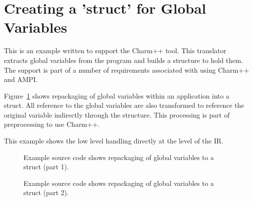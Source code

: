 \section{Creating a 'struct' for Global Variables}
   This is an example written to support the Charm++ tool. This translator
extracts global variables from the program and builds a structure to hold them.
The support is part of a number of requirements associated with using Charm++
and AMPI.

   Figure~\ref{Tutorial:exampleGlobalVariableHandling} shows repackaging of global
variables within an application into a struct. All reference to the global variables
are also transformed to reference the original variable indirectly through the structure.
This processing is part of preprocessing to use Charm++.  

   This example shows the low level handling directly at the level of the IR.

\begin{figure}[!h]
{\indent
{\mySmallestFontSize


\begin{latexonly}
%  
   
\end{latexonly}

\begin{htmlonly}
   
\end{htmlonly}

}
}
\caption{Example source code shows repackaging of global variables to a struct (part 1).}
\label{Tutorial:exampleGlobalVariableHandling}
\end{figure}

\begin{figure}[!h]
{\indent
{\mySmallestFontSize


\begin{latexonly}
   
\end{latexonly}

\begin{htmlonly}
%   
\end{htmlonly}

}
}
\caption{Example source code shows repackaging of global variables to a struct (part 2).}
\label{Tutorial:exampleGlobalVariableHandling2}
\end{figure}


